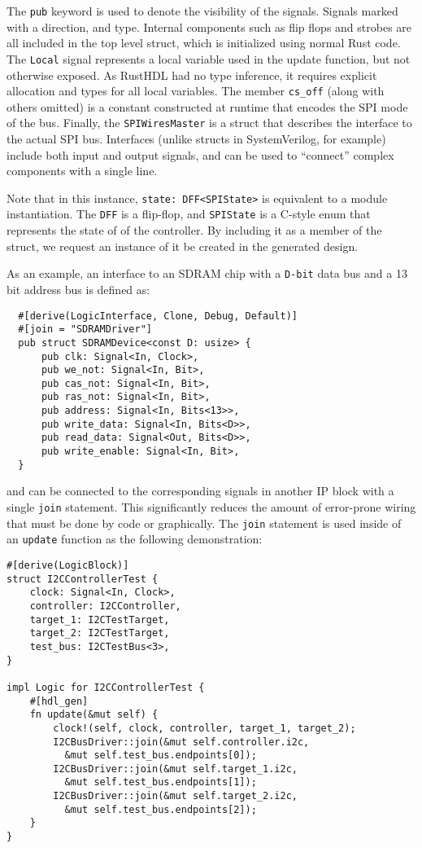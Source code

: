 \documentclass[sigplan,screen,sigconf]{acmart}
\begin{document}
The \verb|pub| keyword is used to denote the visibility of the signals.  Signals 
marked with a direction, and type.  Internal components such as flip flops and strobes
are all included in the top level struct, which is initialized using normal Rust code.
The \verb|Local| signal represents a local variable used in the update function, but
not otherwise exposed.  As RustHDL had no type inference, it requires explicit allocation
and types for all local variables.  The member \verb|cs_off| (along with others omitted) is a  
constant constructed at runtime that encodes the SPI mode of the bus.  Finally, 
the \verb|SPIWiresMaster| is a struct that describes the interface to the actual SPI bus.
Interfaces (unlike structs in SystemVerilog, for example) include both input and output
signals, and can be used to ``connect'' complex components with a single line.  

Note that in this instance, \verb|state: DFF<SPIState>| is equivalent to a module instantiation.
The \verb|DFF| is a flip-flop, and \verb|SPIState| is a C-style enum that represents the state of
of the controller.  By including it as a member of the struct, we request an instance of it be
created in the generated design.


As an example, an interface to an SDRAM chip with a \verb|D-bit| data bus and a 13 bit 
address bus is defined as:

\begin{verbatim}
  #[derive(LogicInterface, Clone, Debug, Default)]
  #[join = "SDRAMDriver"]
  pub struct SDRAMDevice<const D: usize> {
      pub clk: Signal<In, Clock>,
      pub we_not: Signal<In, Bit>,
      pub cas_not: Signal<In, Bit>,
      pub ras_not: Signal<In, Bit>,
      pub address: Signal<In, Bits<13>>,
      pub write_data: Signal<In, Bits<D>>,
      pub read_data: Signal<Out, Bits<D>>,
      pub write_enable: Signal<In, Bit>,
  }
\end{verbatim}

and can be connected to the corresponding signals in another IP block with a single \verb|join|
statement.  This significantly reduces the amount of error-prone wiring that must be done
by code or graphically.  The \verb|join| statement is used inside of an \verb|update| function as the
following demonstration:

\begin{verbatim}
#[derive(LogicBlock)]
struct I2CControllerTest {
    clock: Signal<In, Clock>,
    controller: I2CController,
    target_1: I2CTestTarget,
    target_2: I2CTestTarget,
    test_bus: I2CTestBus<3>,
}

impl Logic for I2CControllerTest {
    #[hdl_gen]
    fn update(&mut self) {
        clock!(self, clock, controller, target_1, target_2);
        I2CBusDriver::join(&mut self.controller.i2c, 
          &mut self.test_bus.endpoints[0]);
        I2CBusDriver::join(&mut self.target_1.i2c,
          &mut self.test_bus.endpoints[1]);
        I2CBusDriver::join(&mut self.target_2.i2c, 
          &mut self.test_bus.endpoints[2]);
    }
}
\end{verbatim}
\end{document}

